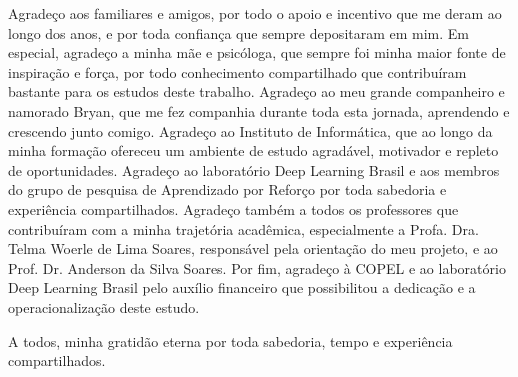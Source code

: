 \begin{agradecimentos}
Agradeço aos familiares e amigos, por todo o apoio e incentivo que me deram ao longo dos anos, e por toda confiança que sempre depositaram em mim. Em especial, agradeço a minha mãe e psicóloga, que sempre foi minha maior fonte de inspiração e força, por todo conhecimento compartilhado que contribuíram bastante para os estudos deste trabalho. Agradeço ao meu grande companheiro e namorado Bryan, que me fez companhia durante toda esta jornada, aprendendo e crescendo junto comigo. Agradeço ao Instituto de Informática, que ao longo da minha formação ofereceu um ambiente de estudo agradável, motivador e repleto de oportunidades. Agradeço ao laboratório Deep Learning Brasil e aos membros do grupo de pesquisa de Aprendizado por Reforço por toda sabedoria e experiência compartilhados. Agradeço também a todos os professores que contribuíram com a minha trajetória acadêmica, especialmente a Profa. Dra. Telma Woerle de Lima Soares, responsável pela orientação do meu projeto, e ao Prof. Dr. Anderson da Silva Soares. Por fim, agradeço à COPEL e ao laboratório Deep Learning Brasil pelo auxílio financeiro que possibilitou a dedicação e a operacionalização deste estudo.

A todos, minha gratidão eterna por toda sabedoria, tempo e experiência compartilhados. 
\end{agradecimentos}


